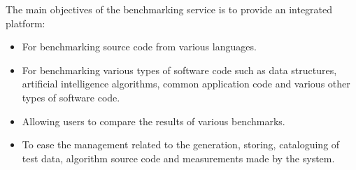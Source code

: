 The main objectives of the benchmarking service is to provide an integrated platform:
\begin{itemize}
	\item For benchmarking source code from various languages.
	\item For benchmarking various types of software code such as data structures,
        artificial intelligence algorithms, common application code and various 
        other types of software code.
	\item Allowing users to compare the results of various benchmarks.
	\item To ease the management related to the generation, storing, cataloguing 
        of test data, algorithm source code and measurements made by the system.
\end{itemize}
